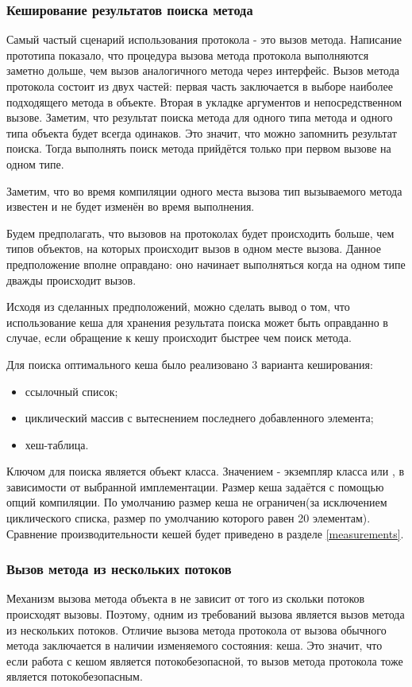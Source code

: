 \subsubsection{Кеширование результатов поиска метода}
Самый частый сценарий использования протокола - это вызов метода. Написание прототипа показало, что процедура вызова метода протокола выполняются заметно дольше, чем вызов аналогичного метода через интерфейс. Вызов метода протокола состоит из двух частей: первая часть заключается в выборе наиболее подходящего метода в объекте. Вторая в укладке аргументов и непосредственном вызове. Заметим, что результат поиска метода для одного типа метода и одного типа объекта будет всегда одинаков. Это значит, что можно запомнить результат поиска. Тогда выполнять поиск метода прийдётся только при первом вызове на одном типе.

Заметим, что во время компиляции одного места вызова тип вызываемого метода известен и не будет изменён во время выполнения.

Будем предполагать, что вызовов на протоколах будет происходить больше, чем типов объектов, на которых происходит вызов в одном месте вызова. Данное предположение вполне оправдано: оно начинает выполняться когда на одном типе дважды происходит вызов.

Исходя из сделанных предположений, можно сделать вывод о том, что использование кеша для хранения результата поиска может быть оправданно в случае, если обращение к кешу происходит быстрее чем поиск метода.

Для поиска оптимального кеша было реализовано 3 варианта кеширования:
\begin{itemize}
  \item ссылочный список;
  \item циклический массив с вытеснением последнего добавленного элемента;
  \item хеш-таблица.
\end{itemize}

Ключом для поиска является объект класса. Значением - экземпляр класса  или , в зависимости от выбранной имплементации. Размер кеша задаётся с помощью опций компиляции. По умолчанию размер кеша не ограничен(за исключением циклического списка, размер по умолчанию которого равен 20 элементам). Сравнение производительности кешей будет приведено в разделе \ref{measurements}.

\subsubsection{Вызов метода из нескольких потоков}
Механизм вызова метода объекта в  не зависит от того из скольки потоков происходят вызовы. Поэтому, одним из требований вызова является вызов метода из нескольких потоков. Отличие вызова метода протокола от вызова обычного метода заключается в наличии изменяемого состояния: кеша. Это значит, что если работа с кешом является потокобезопасной, то вызов метода протокола тоже является потокобезопасным.


